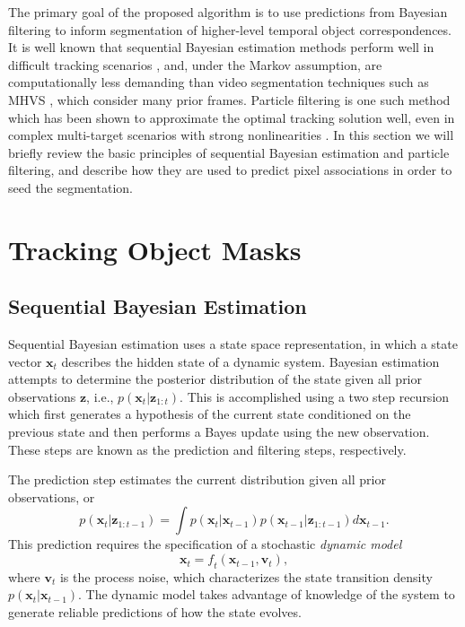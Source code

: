 The primary goal of the proposed algorithm is to use predictions from Bayesian filtering to inform segmentation of higher-level temporal object correspondences. It is well known that sequential Bayesian estimation methods perform well in difficult tracking scenarios \cite{Doucet2001}, and, under the Markov assumption, are computationally less demanding than video segmentation techniques such as MHVS \cite{MHVS}, which consider many prior frames. Particle filtering is one such method which has been shown to approximate the optimal tracking solution well, even in complex multi-target scenarios with strong nonlinearities \cite{TrackingMultipleParticleFiltering,MonteCarloMTT,SequentialMonteCarloMultitargetFiltering}. In this section we will briefly review the basic principles of sequential Bayesian estimation and particle filtering, and describe how they are used to predict pixel associations in order to seed the segmentation.

\section{Tracking Object Masks}
\subsection{Sequential Bayesian Estimation}
Sequential Bayesian estimation uses a state space representation, in which a state vector $\mathbf{x}_t$ describes the hidden state of a dynamic system. Bayesian estimation attempts to determine the posterior distribution of the state given all prior observations $\mathbf{z}$, i.e., $\mathit{p}(\mathbf{x}_t|\mathbf{z}_{1:t})$. This is accomplished using a two step recursion which first generates a hypothesis of the current state conditioned on the previous state and then performs a Bayes update using the new observation. These steps are known as the prediction and filtering steps, respectively. 

The prediction step estimates the current distribution given all prior observations, or
\begin{equation} \label{eqn:prior}
\mathit{p}(\mathbf{x}_t|\mathbf{z}_{1:t-1}) =  \int{ \mathit{p}(\mathbf{x}_t|\mathbf{x}_{t-1})\mathit{p}(\mathbf{x}_{t-1}|\mathbf{z}_{1:t-1}) \mathit{d}\mathbf{x}_{t-1}}. 
\end{equation}
This prediction requires the specification of a stochastic \textit{dynamic model} 
\begin{equation} 
\mathbf{x}_t = \mathit{f}_t(\mathbf{x}_{t-1},\mathbf{v}_t) ,
\end{equation}
where $\mathbf{v}_t$ is the process noise, which characterizes the state transition density $\mathit{p}(\mathbf{x}_t|\mathbf{x}_{t-1})$. The dynamic model takes advantage of knowledge of the system to generate reliable predictions of how the state evolves. 

